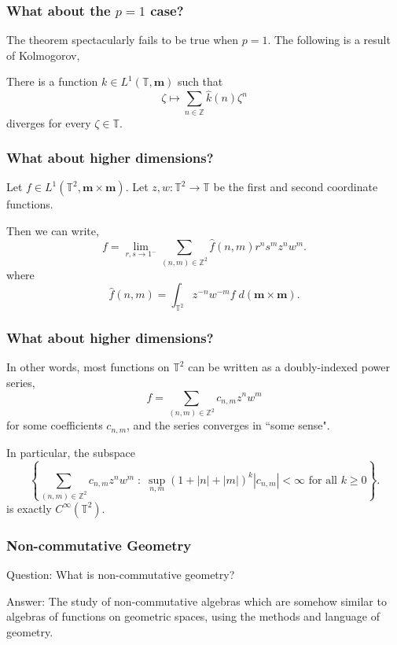 \documentclass{beamer}
\newcommand{\Circ}{\mathbb{T}}
\newcommand{\Itgr}{\mathbb{Z}}
\newcommand{\ha}{\boldsymbol{m}}
\begin{document}
\begin{frame}
    \frametitle{What about the $p = 1$ case?}
    The theorem spectacularly fails to be true when $p=1$.
    The following is a result of Kolmogorov,
    \begin{theorem}
        There is a function $k \in L^1(\Circ,\ha)$ such that
        \begin{equation*}
            \zeta \mapsto \sum_{n\in\Itgr} \widehat{k}(n)\zeta^n
        \end{equation*}
        diverges for every $\zeta \in \Circ$.
    \end{theorem}
\end{frame}

\begin{frame}
    \frametitle{What about higher dimensions?}
    Let $f \in L^1(\Circ^2,\ha\times\ha)$. 
    Let $z,w:\Circ^2\rightarrow\Circ$ be the first and second coordinate functions.
    
    Then we can write,
    \begin{equation*}
        f = \lim_{r,s\rightarrow 1^-} \sum_{(n,m) \in \Itgr^2} \widehat{f}(n,m)r^ns^mz^nw^m.
    \end{equation*}
    where
    \begin{equation*}
        \widehat{f}(n,m) = \int_{\Circ^2} z^{-n}w^{-m} f\;d(\ha\times\ha).
    \end{equation*}
\end{frame}

\begin{frame}
    \frametitle{What about higher dimensions?}
    In other words, most functions on $\Circ^2$ can be written as a doubly-indexed
    power series,
    \begin{equation*}
        f = \sum_{(n,m) \in \Itgr^2} c_{n,m} z^nw^m
    \end{equation*}
    for some  coefficients $c_{n,m}$, and the series converges
    in ``some sense".
    
    
    In particular, the subspace
    \begin{equation*}
        \left\{ \sum_{(n,m) \in \Itgr^2} c_{n,m}z^nw^m\;:\; \sup_{n,m} (1+|n|+|m|)^k|c_{n,m}| < \infty \text{ for all }k \geq 0\right\}.
    \end{equation*}
    is exactly $C^\infty(\Circ^2)$.
\end{frame}


\begin{frame}
    \frametitle{Non-commutative Geometry}
    Question: What is non-commutative geometry?
    
    \begin{block}
        {Answer:}   
            The study of non-commutative algebras which are somehow similar
            to algebras of functions on geometric spaces, using the methods
            and language of geometry.
    \end{block}
\end{frame}
\end{document}
